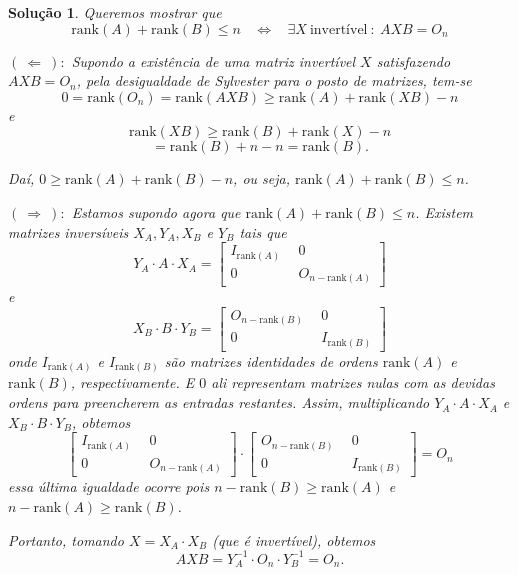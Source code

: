 \documentclass{hipatia}
\newtheorem*{solution*}{Solução}
\begin{document}
\begin{solution*}
Queremos mostrar que $$\mbox{rank}(A) + \mbox{rank}(B) \leq n \ \ \ \ \Leftrightarrow \ \ \ \ \exists X \ \mbox{invertível} \ : \ AXB = O_n$$

$( \ \Leftarrow \ ) :$ Supondo a existência de uma matriz invertível $X$ satisfazendo $AXB = O_n$, pela desigualdade de Sylvester para o posto de matrizes, tem-se $$0 = \mbox{rank}(O_n) = \mbox{rank}(AXB) \geq \mbox{rank}(A) + \mbox{rank}(XB) - n $$ e $$\mbox{rank}(XB) \geq \mbox{rank}(B) + \mbox{rank}(X) - n $$ $$= \mbox{rank}(B) + n - n = \mbox{rank}(B).$$

Daí, $0 \geq \mbox{rank}(A) + \mbox{rank}(B) - n$, ou seja, $\mbox{rank}(A) + \mbox{rank}(B) \leq n$.



\vspace{0.3cm}
$( \ \Rightarrow \ ) :$ Estamos supondo agora que $\mbox{rank}(A) + \mbox{rank}(B) \leq n$. 
Existem matrizes inversíveis $X_A, Y_A, X_B$ e $Y_B$ 
tais que $$Y_A \cdot A \cdot X_A = \begin{bmatrix}
    I_{\mbox{rank}(A)} & \ \ 0 \\ 0 & \ \ O_{n - \mbox{rank}(A)}
\end{bmatrix}$$ e $$X_B \cdot B \cdot Y_B = \begin{bmatrix}
    O_{n - \mbox{rank}(B)} & \ \ 0 \\ 0 & \ \ I_{\mbox{rank}(B)} 
\end{bmatrix}$$ onde $I_{\mbox{rank}(A)}$ e $I_{\mbox{rank}(B)}$ são matrizes identidades de ordens $\mbox{rank}(A)$ e $\mbox{rank}(B)$, respectivamente. E $0$ ali representam matrizes nulas com as devidas ordens para preencherem as entradas restantes.
 Assim, multiplicando $Y_A \cdot A \cdot X_A$ e  
 $X_B \cdot B \cdot Y_B $, obtemos 
 $$\begin{bmatrix}
    I_{\mbox{rank}(A)} & \ \ 0 \\ 0 & \ \ O_{n - \mbox{rank}(A)}
\end{bmatrix} \cdot \begin{bmatrix}
    O_{n - \mbox{rank}(B)} & \ \ 0 \\ 0 & \ \ I_{\mbox{rank}(B)} 
\end{bmatrix} = O_n$$ 
essa última igualdade ocorre pois $n - \mbox{rank}(B) \geq \mbox{rank}(A)$  e $n - \mbox{rank}(A) \geq \mbox{rank}(B)$. 

\vspace{0.3cm}

Portanto, tomando $X = X_A \cdot X_B$ (que é invertível),
 obtemos $$AXB = Y_A^{-1} \cdot O_n \cdot Y_B^{-1} = O_n.$$
\end{solution*}
\end{document}
